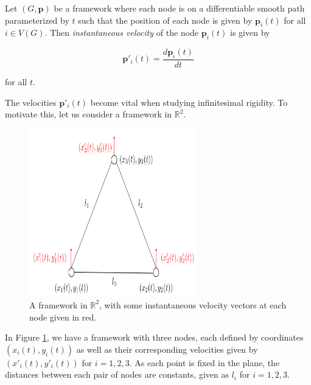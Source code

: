 \vspace{-3mm}
\begin{definition}
    Let $(G,\mathbf{p})$ be a framework where each node is on a differentiable smooth path parameterized by $t$ such that the position of each node is given by $\mathbf{p}_i(t)$ for all $i \in  V(G)$. Then \textit{instantaneous velocity} of the node $\mathbf{p}_i(t)$ is given by
    
    \[
    \mathbf{p}'_i(t) = \frac{d\mathbf{p}_i(t)}{dt}
    \]
    
    \noindent
    for all $t$.
\end{definition} 


\begin{flushleft}
The velocities $\mathbf{p}'_i(t)$ become vital when studying infinitesimal rigidity. To motivate this, let us consider a framework in $\mathbb{R}^2$.
\end{flushleft}

\begin{figure}[htbp]
    \centering
    \includegraphics[width = 0.65\textwidth]{Chapter 2/13. inf_rigid_proof.png}
    \caption{A framework in $\mathbb{R}^2$, with some instantaneous velocity vectors at each node given in red.}
    \label{fig: inf_velocity}
\end{figure}

\vspace{-3mm}
\begin{flushleft}
In Figure \ref{fig: inf_velocity}, we have a framework with three nodes, each defined by coordinates $(x_i(t), y_i(t))$ as well as their corresponding velocities given by $(x'_i(t), y'_i(t))$ for $i = 1,2,3$. As each point is fixed in the plane, the distances between each pair of nodes are constants, given as $l_i$ for $i = 1,2,3$.
\end{flushleft}

